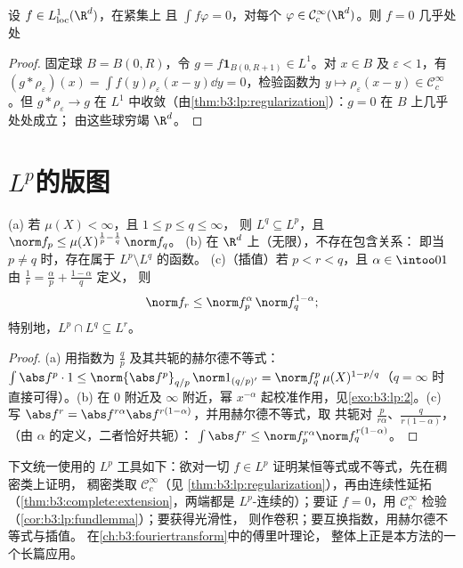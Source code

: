 \begin{corollary}[变分法基本
引理]\label{cor:b3:lp:fundlemma}
设 $f \in L^1_{\mathrm{loc}}(\R^d)$，在紧集上
且 $\int f\varphi = 0$，对每个 $\varphi \in \mathcal
C^\infty_c(\R^d)$。则 $f = 0$ 几乎处处
\end{corollary}

\begin{proof}
固定球 $B = B(0, R)$，令 $g = f\mathbf 1_{B(0, R+1)}
\in L^1$。对 $x \in B$ 及 $\varepsilon < 1$，有 $(g *
\rho_\varepsilon)(x) = \int f(y)\rho_\varepsilon(x - y)\dd y =
0$，检验函数为 $y \mapsto \rho_\varepsilon(x-y)
\in \mathcal C_c^\infty$。但 $g * \rho_\varepsilon \to g$ 在
$L^1$ 中收敛（由\cref{thm:b3:lp:regularization}）：$g = 0$ 在 $B$ 上几乎处处成立；
由这些球穷竭 $\R^d$。
\end{proof}

\section{\texorpdfstring{$L^p$}{Lp}的版图}

\begin{proposition}\label{prop:b3:lp:inclusions}
(a) 若 $\mu(X) < \infty$，且 $1 \leq p \leq q \leq \infty$，
则 $L^q \subseteq L^p$，且 $\norm f_p \leq
\mu(X)^{\frac1p - \frac1q}\,\norm f_q$。
(b) 在 $\R^d$ 上（无限），不存在包含关系：
即当 $p \neq q$ 时，存在属于 $L^p\setminus L^q$ 的函数。
(c)（插值）若 $p < r < q$，且 $\alpha \in \intoo01$
由 $\frac1r = \frac\alpha p + \frac{1 - \alpha}q$ 定义，
则
\[
\norm f_r \leq \norm f_p^{\alpha}\,\norm f_q^{1 - \alpha} ;
\]
特别地，$L^p \cap L^q \subseteq L^r$。
\end{proposition}

\begin{proof}
(a) 用指数为 $\frac qp$ 及其共轭的赫尔德不等式：
$\int\abs f^p\cdot 1 \leq \norm{\abs f^p}_{q/p}\,\norm
1_{(q/p)'} = \norm f_q^p\,\mu(X)^{1 - p/q}$（$q = \infty$ 时
直接可得）。(b) 在 $0$ 附近及 $\infty$ 附近，幂 $x^{-\alpha}$
起校准作用，见\cref{exo:b3:lp:2}。(c) 写 $\abs f^r = \abs
f^{r\alpha}\abs f^{r(1-\alpha)}$，并用赫尔德不等式，取
共轭对 $\frac p{r\alpha}$、$\frac q{r(1-\alpha)}$，
（由 $\alpha$ 的定义，二者恰好共轭）：
$\int\abs f^r \leq \norm f_p^{r\alpha}\norm f_q^{r(1 -
\alpha)}$。
\end{proof}

\begin{method}\label{met:b3:lp:toolkit}
下文统一使用的 $L^p$ 工具如下：欲对一切
$f \in L^p$ 证明某恒等式或不等式，先在稠密类上证明，
稠密类取 $\mathcal C_c^\infty$（见
\cref{thm:b3:lp:regularization}），再由连续性延拓
（\cref{thm:b3:complete:extension}，两端都是
$L^p$-连续的）；要证 $f = 0$，用 $\mathcal
C_c^\infty$ 检验（\cref{cor:b3:lp:fundlemma}）；要获得光滑性，
则作卷积；要互换指数，用赫尔德不等式与插值。
在\cref{ch:b3:fouriertransform}中的傅里叶理论，
整体上正是本方法的一个长篇应用。
\end{method}

